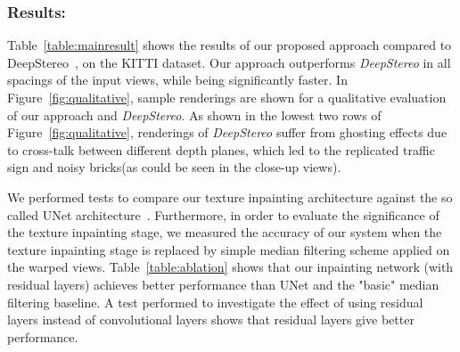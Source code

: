 \documentclass[runningheads]{llncs}
\begin{document}
\subsubsection*{Results:} Table~\ref{table:mainresult} shows the results of our proposed approach compared to DeepStereo~\cite{flynn2015deepstereo}, on the KITTI dataset. Our approach outperforms \textit{DeepStereo} in all spacings of the input views, while being significantly faster. In Figure~\ref{fig:qualitative}, sample renderings are shown for a qualitative evaluation of our approach and \textit{DeepStereo}. As shown in the lowest two rows of Figure~\ref{fig:qualitative}, renderings of \textit{DeepStereo} suffer from ghosting effects due to cross-talk between different depth planes, which led to the replicated traffic sign and noisy bricks(as could be seen in the close-up views).

We performed tests to compare our texture inpainting architecture against the so called UNet architecture~\cite{ronneberger2015u}. Furthermore, in order to evaluate the significance of the texture inpainting stage, we measured the accuracy of our system when the texture inpainting stage is replaced by simple median filtering scheme applied on the warped views. Table~\ref{table:ablation} shows that our inpainting network (with residual layers) achieves better performance than UNet and the "basic" median filtering baseline. A test performed to investigate the effect of using residual layers instead of convolutional layers shows that residual layers give better performance.


%  
\end{document}
